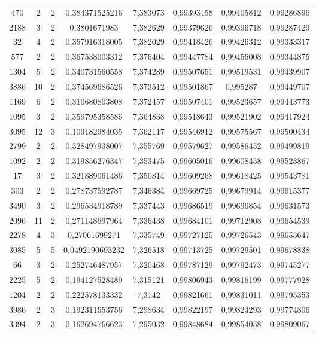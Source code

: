 \begin{longtable}{|c|c|c|c|c|c|c|c|}
470 & 2 & 2 & 0,384371525216 & 7,383073 & 0,99393458 & 0,99405812 & 0,99286896 \\
2188 & 3 & 2 & 0,3801671983 & 7,382629 & 0,99379626 & 0,99396718 & 0,99287429 \\
32 & 4 & 2 & 0,357916318005 & 7,382029 & 0,99418426 & 0,99426312 & 0,99333317 \\
577 & 2 & 2 & 0,367538003312 & 7,376404 & 0,99447784 & 0,99456008 & 0,99344875 \\
1304 & 5 & 2 & 0,340731560558 & 7,374289 & 0,99507651 & 0,99519531 & 0,99439907 \\
3886 & 10 & 2 & 0,374569686526 & 7,373512 & 0,99501867 & 0,995287 & 0,99449707 \\
1169 & 6 & 2 & 0,310680803808 & 7,372457 & 0,99507401 & 0,99523657 & 0,99443773 \\
1095 & 3 & 2 & 0,359795358586 & 7,364838 & 0,99518643 & 0,99521902 & 0,99417924 \\
3095 & 12 & 3 & 0,109182984035 & 7,362117 & 0,99546912 & 0,99575567 & 0,99500434 \\
2799 & 2 & 2 & 0,328497938007 & 7,355769 & 0,99579627 & 0,99586452 & 0,99499819 \\
1092 & 2 & 2 & 0,319856276347 & 7,353475 & 0,99605016 & 0,99608458 & 0,99523867 \\
17 & 3 & 2 & 0,321889061486 & 7,350814 & 0,99609268 & 0,99618425 & 0,99543781 \\
303 & 2 & 2 & 0,278737592787 & 7,346384 & 0,99669725 & 0,99679914 & 0,99615377 \\
3490 & 3 & 2 & 0,296534918789 & 7,337443 & 0,99686519 & 0,99696854 & 0,99631573 \\
2096 & 11 & 2 & 0,271148697964 & 7,336438 & 0,99684101 & 0,99712908 & 0,99654539 \\
2278 & 4 & 3 & 0,27061699271 & 7,335749 & 0,99727125 & 0,99726543 & 0,99653647 \\
3085 & 5 & 5 & 0,0492190693232 & 7,326518 & 0,99713725 & 0,99729501 & 0,99678838 \\
66 & 3 & 2 & 0,252746487957 & 7,320468 & 0,99787129 & 0,99792473 & 0,99745277 \\
2225 & 5 & 2 & 0,194127528489 & 7,315121 & 0,99806943 & 0,99816199 & 0,99777928 \\
1204 & 2 & 2 & 0,222578133332 & 7,3142 & 0,99821661 & 0,99831011 & 0,99795353 \\
3986 & 2 & 3 & 0,192311653756 & 7,298634 & 0,99822197 & 0,99824293 & 0,99774806 \\
3394 & 2 & 3 & 0,162694766623 & 7,295032 & 0,99848684 & 0,99854058 & 0,99809067 \\

\end{longtable}
